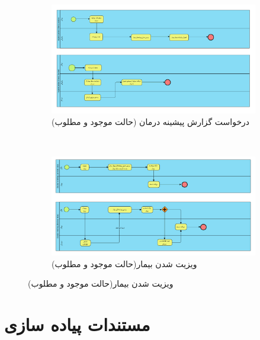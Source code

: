 \documentclass[a4paper,12pt]{report}
\begin{document}
	\pagebreak
	\begin{figure}[!h]
		\label{fig2:sec6:chap1}
		\begin{center}
			\begin{subfigure}[t]{\textwidth}
				\includegraphics[width=\linewidth]{diagrams/requestPatientHistory.pdf}
				\caption{درخواست گزارش پیشینه درمان (حالت موجود و مطلوب)}
				\label{subfig3:fig1:sec6:chap1}
			\end{subfigure}	\\
			\begin{subfigure}[t]{\textwidth}
				\includegraphics[width=\textwidth]{diagrams/visiting.pdf}
				\caption{ویزیت شدن بیمار(حالت موجود و مطلوب)}
				\label{subfig4:fig1:sec6:chap1}
			\end{subfigure}	
		\end{center}
	\end{figure}

	\pagebreak
	\chapter{
	مستندات پیاده سازی}
	\pagebreak
\end{document}
